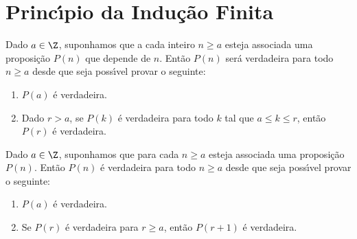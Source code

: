 \section{Princ{\'\i}pio da Indu{\c c}{\~a}o Finita}

\begin{teorema}
Dado $a \in \Z$, suponhamos que a cada inteiro $n\geq a$ esteja associada uma proposi{\c c}{\~a}o $P(n)$ que depende de $n$. Ent{\~a}o $P(n)$ ser{\'a} verdadeira para todo $n\geq a$ desde que seja poss{\'\i}vel provar o seguinte:
\begin{enumerate}
\item $P(a)$ {\'e} verdadeira.
\item Dado $r > a$, se $P(k)$ {\'e} verdadeira para todo $k$ tal que $a \leq k\leq r$, ent{\~a}o $P(r)$ {\'e} verdadeira.
\end{enumerate}
\end{teorema}

\begin{teorema}
Dado $a \in \Z$, suponhamos que para cada $n\geq a$ esteja associada uma proposi{\c c}{\~a}o $P(n)$. Ent{\~a}o $P(n)$ {\'e} verdadeira para todo $n \geq a$ desde que seja poss{\'\i}vel provar o seguinte:
\begin{enumerate}
\item $P(a)$ {\'e} verdadeira.
\item Se $P(r)$ {\'e} verdadeira para $r \geq a$, ent{\~a}o $P(r+1)$ {\'e} verdadeira.
\end{enumerate}
\end{teorema}

